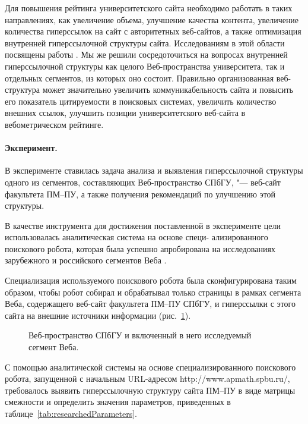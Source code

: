 Для повышения рейтинга университетского сайта необходимо работать в таких направлениях, как увеличение объема, улучшение качества контента, увеличение количества гиперссылок на сайт с авторитетных веб-сайтов, а также оптимизация внутренней гиперссылочной структуры сайта. Исследованиям в этой области посвящены работы \cite{HolmbergThelwall,Pechnikov,Pechnikov2,PechnikovChirkovChuiko,BlekanovSergeevPechnikov,BlekanovSergeevMaksimov,BlekanovSergeev}. Мы же решили сосредоточиться на вопросах внутренней гиперссылочной структуры как целого Веб-пространства университета, так и отдельных сегментов, из которых оно состоит. Правильно организованная веб-структура может значительно увеличить коммуникабельность сайта и повысить его показатель цитируемости в поисковых системах, увеличить количество внешних ссылок, улучшить позиции университетского веб-сайта в вебометрическом рейтинге.

\paragraph{Эксперимент.} В эксперименте ставилась задача анализа и выявления гиперссылочной структуры одного из сегментов, составляющих Веб-пространство СПбГУ, "--- веб-сайт факультета ПМ–ПУ, а также получения рекомендаций по улучшению этой структуры.

В качестве инструмента для достижения поставленной в эксперименте цели использовалась аналитическая система на основе специ- ализированного поискового робота, которая была успешно апробирована на исследованиях зарубежного и российского сегментов Веба \cite{BlekanovSergeevPechnikov,BlekanovSergeevMaksimov,BlekanovSergeev,BlekanovSergeevMartynenko}.

Специализация используемого поискового робота была сконфигурирована таким образом, чтобы робот собирал и обрабатывал только страницы в рамках сегмента Веба, содержащего веб-сайт факультета ПМ–ПУ СПбГУ, и гиперссылки с этого сайта на внешние источники информации (рис.~\cref{fig:spbuApmathWebSpace}).

\begin{figure}[ht]
	\caption{Веб-пространство СПбГУ и включенный в него исследуемый сегмент Веба.}\label{fig:spbuApmathWebSpace}
\end{figure}

С помощью аналитической системы на основе специализированного поискового робота, запущенной с начальным URL-адресом http://www.apmath.spbu.ru/, требовалось выявить гиперссылочную структуру сайта ПМ–ПУ в виде матрицы смежности и определить значения параметров, приведенных в таблице~\cref{tab:researchedParameters}.

